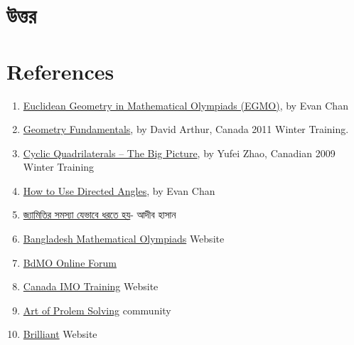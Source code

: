 \documentclass[a4paper,11pt]{article}
\begin{document}
\section{উত্তর}
\shipoutAnswer
\newpage
\section{References}
\begin{enumerate}
	\item \href{https://web.evanchen.cc/geombook.html}{Euclidean Geometry in Mathematical Olympiads (EGMO)}, by Evan Chan
	\item \href{https://sites.google.com/site/imocanada/2011-winter-camp/Geometry.pdf?attredirects=0}{Geometry Fundamentals}, by David Arthur, Canada 2011 Winter Training.
	\item \href{http://yufeizhao.com/olympiad/cyclic_quad.pdf}{Cyclic Quadrilaterals – The Big Picture}, by Yufei Zhao, Canadian 2009 Winter Training
	\item \href{https://web.evanchen.cc/handouts/Directed-Angles/Directed-Angles.pdf}{How to Use Directed Angles}, by Evan Chan
	\item \href{https://drive.google.com/drive/folders/0B8NfhxOmm_tpbW1zOENuWElCTWM}{জ্যামিতির সমস্যা যেভাবে ধরতে হয়}- আদীব হাসান
	\item \href{https://matholympiad.org.bd}{Bangladesh Mathematical Olympiads} Website
	\item \href{https://matholympiad.org.bd/forum/}{BdMO Online Forum}
	\item \href{https://sites.google.com/site/imocanada/}{Canada IMO Training} Website
	\item \href{https://artofproblemsolving.com/community}{Art of Prolem Solving} community
	\item \href{https://brilliant.org/}{Brilliant} Website
\end{enumerate}
\end{document}
